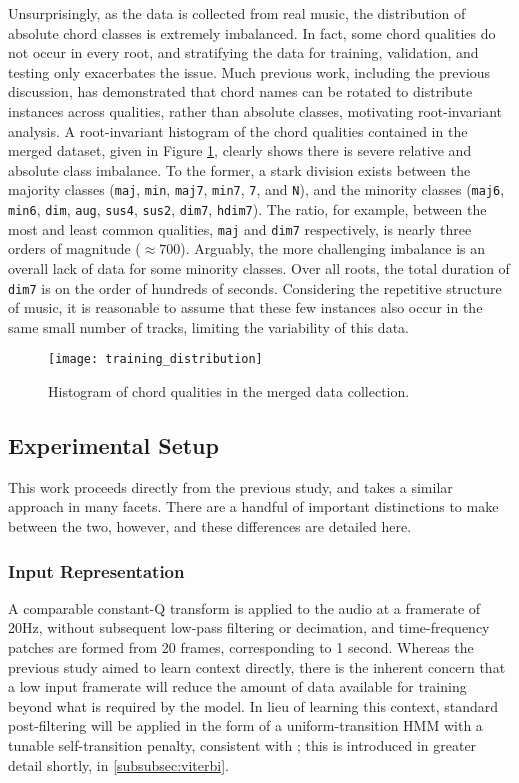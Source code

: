 Unsurprisingly, as the data is collected from real music, the distribution of absolute chord classes is extremely imbalanced.
In fact, some chord qualities do not occur in every root, and stratifying the data for training, validation, and testing only exacerbates the issue.
Much previous work, including the previous discussion, has demonstrated that chord names can be rotated to distribute instances across qualities, rather than absolute classes, motivating root-invariant analysis.
A root-invariant histogram of the chord qualities contained in the merged dataset, given in Figure \ref{fig:training_distribution}, clearly shows there is severe relative and absolute class imbalance.
To the former, a stark division exists between the majority classes (\texttt{maj}, \texttt{min}, \texttt{maj7}, \texttt{min7}, \texttt{7}, and \texttt{N}), and the minority classes (\texttt{maj6}, \texttt{min6}, \texttt{dim}, \texttt{aug}, \texttt{sus4}, \texttt{sus2}, \texttt{dim7}, \texttt{hdim7}).
The ratio, for example, between the most and least common qualities, \texttt{maj} and \texttt{dim7} respectively, is nearly three orders of magnitude ($\approx 700$).
Arguably, the more challenging imbalance is an overall lack of data for some minority classes.
Over all roots, the total duration of \texttt{dim7} is on the order of hundreds of seconds.
Considering the repetitive structure of music, it is reasonable to assume that these few instances also occur in the same small number of tracks, limiting the variability of this data.

\begin{figure}[!t]
\centering
\texttt{[image: training\_distribution]}
\caption{Histogram of chord qualities in the merged data collection.}
\label{fig:training_distribution}
\end{figure}


\subsection{Experimental Setup}
\label{subsec:experimental_setup}
This work proceeds directly from the previous study, and takes a similar approach in many facets.
There are a handful of important distinctions to make between the two, however, and these differences are detailed here.

\subsubsection{Input Representation}
\label{subsubsec:data_considerations}
A comparable constant-Q transform is applied to the audio at a framerate of 20Hz, without subsequent low-pass filtering or decimation, and time-frequency patches are formed from 20 frames, corresponding to 1 second.
Whereas the previous study aimed to learn context directly, there is the inherent concern that a low input framerate will reduce the amount of data available for training beyond what is required by the model.
In lieu of learning this context, standard post-filtering will be applied in the form of a uniform-transition HMM with a tunable self-transition penalty, consistent with \cite{Cho2014PhD}; this is introduced in greater detail shortly, in \ref{subsubsec:viterbi}.

